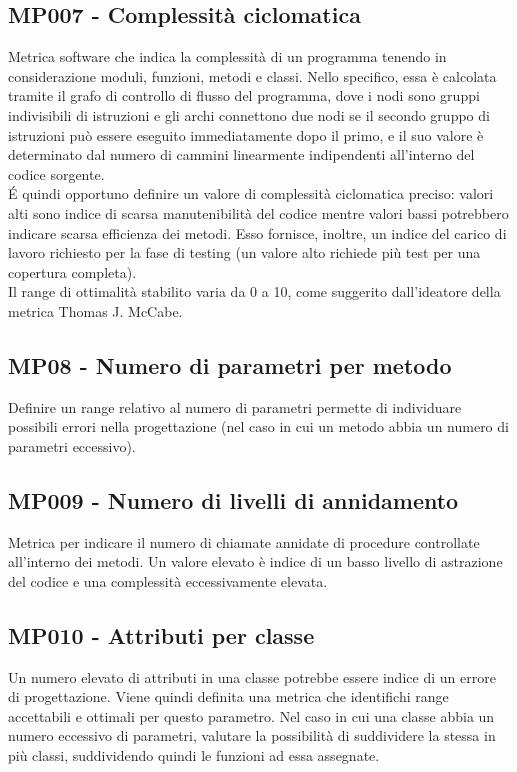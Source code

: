 \subsection{MP007 - Complessità ciclomatica}
Metrica software che indica la complessità di un programma tenendo in considerazione moduli, funzioni, metodi e classi.
Nello specifico, essa è calcolata tramite il grafo di controllo di flusso del programma, dove i nodi sono gruppi indivisibili di istruzioni e gli archi connettono due nodi se il secondo gruppo di istruzioni può essere eseguito immediatamente dopo il primo, e il suo valore è determinato dal numero di cammini linearmente indipendenti all'interno del codice sorgente.\\
\'E quindi opportuno definire un valore di complessità ciclomatica preciso: valori alti sono indice di scarsa manutenibilità del codice mentre valori bassi potrebbero indicare scarsa efficienza dei metodi.
Esso fornisce, inoltre, un indice del carico di lavoro richiesto per la fase di testing (un valore alto richiede più test per una copertura completa).\\
Il range di ottimalità stabilito varia da 0 a 10, come suggerito dall'ideatore della metrica Thomas J. McCabe.  

\subsection{MP08 - Numero di parametri per metodo}
Definire un range relativo al numero di parametri permette di individuare possibili errori nella progettazione (nel caso in cui un metodo abbia un numero di parametri eccessivo).

\subsection{MP009 - Numero di livelli di annidamento}
Metrica per indicare il numero di chiamate annidate di procedure controllate all'interno dei metodi.\newline
Un valore elevato è indice di un basso livello di astrazione del codice e una complessità eccessivamente elevata. 

\subsection{MP010 - Attributi per classe}
Un numero elevato di attributi in una classe potrebbe essere indice di un errore di progettazione.
Viene quindi definita una metrica che identifichi range accettabili e ottimali per questo parametro.
Nel caso in cui una classe abbia un numero eccessivo di parametri, valutare la possibilità di suddividere la stessa in più classi, suddividendo quindi le funzioni ad essa assegnate.

